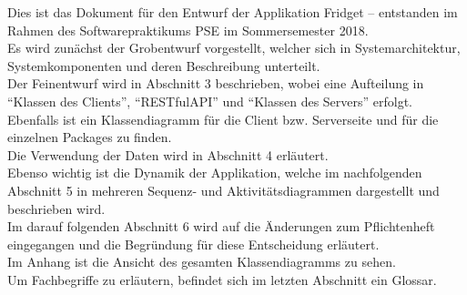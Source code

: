 Dies ist das Dokument für den Entwurf der Applikation Fridget – entstanden im Rahmen des Softwarepraktikums PSE im Sommersemester 2018.\\
Es wird zunächst der Grobentwurf vorgestellt, welcher sich in Systemarchitektur, Systemkomponenten und deren Beschreibung unterteilt. \\
Der Feinentwurf wird in Abschnitt 3 beschrieben, wobei eine Aufteilung in ``Klassen des Clients'', ``RESTfulAPI'' und ``Klassen des Servers'' erfolgt. Ebenfalls ist ein Klassendiagramm für die Client bzw. Serverseite und für die einzelnen Packages zu finden. \\Die Verwendung der Daten wird in Abschnitt 4 erläutert.\\
Ebenso wichtig ist die Dynamik der Applikation, welche im nachfolgenden Abschnitt 5 in mehreren Sequenz- und Aktivitätsdiagrammen dargestellt und beschrieben wird.\\ 
Im darauf folgenden Abschnitt 6 wird auf die Änderungen zum Pflichtenheft eingegangen und die Begründung für diese Entscheidung erläutert.\\
Im Anhang ist die Ansicht des gesamten Klassendiagramms zu sehen.\\
Um Fachbegriffe zu erläutern, befindet sich im letzten Abschnitt ein Glossar.
